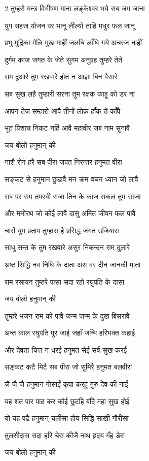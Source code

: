\begin{large}
\begin{multicols}{2}
\twolineshloka
{तुम्हरो मन्त्र विभीषण माना}
{लङ्केश्वर भये सब जग जाना}

\twolineshloka
{युग सहस्र योजन पर भानू}
{लील्यो ताहि मधुर फल जानू}

\twolineshloka
{प्रभु मुद्रिका मेलि मुख माहीं}
{जलधि लाँघि गये अचरज नाहीं}

\twolineshloka
{दुर्गम काज जगत के जेते}
{सुगम अनुग्रह तुम्हरे तेते}

\twolineshloka
{राम दुआरे तुम रखवारे}
{होत न आज्ञा बिन पैसारे}

\twolineshloka
{सब सुख लहै तुम्हारी सरना}
{तुम रक्षक काहू को डर ना}

\twolineshloka
{आपन तेज सम्हारो आपै}
{तीनों लोक हाँक तें काँपै}

\twolineshloka
{भूत पिशाच निकट नहिं आवै}
{महावीर जब नाम सुनावै}

{जय बोलो हनुमान् की}

\twolineshloka
{नाशै रोग हरै सब पीरा}
{जपत निरन्तर हनुमत वीरा}

\twolineshloka
{सङ्कट से हनुमान छुडावै}
{मन क्रम वचन ध्यान जो लावै}

\twolineshloka
{सब पर राम तपस्वी राजा}
{तिन के काज सकल तुम साजा}

\twolineshloka
{और मनोरथ जो कोई लावै}
{दासु अमित जीवन फल पावै}

\twolineshloka
{चारों युग प्रताप तुम्हारा}
{है प्रसिद्ध जगत उजियारा}

\twolineshloka
{साधु सन्त के तुम रखवारे}
{असुर निकन्दन राम दुलारे}

\twolineshloka
{अष्ट सिद्धि नव निधि के दाता}
{अस बर दीन जानकी माता}

\twolineshloka
{राम रसायन तुम्हरे पासा}
{सदा रहो रघुपति के दासा}

{जय बोलो हनुमान् की}

\twolineshloka
{तुम्हरे भजन राम को पावै}
{जन्म जन्म के दुख बिसरावै}

\twolineshloka
{अन्त काल रघुपति पुर जाई}
{जहाँ जन्मि हरिभक्त कहाई}

\twolineshloka
{और देवता चित्त न धरई}
{हनुमत सेई सर्व सुख करई}

\twolineshloka
{सङ्कट कटै मिटै सब पीरा}
{जो सुमिरै हनुमत बलवीरा}

\twolineshloka
{जै जै जै हनुमान गोसाईं}
{कृपा करहु गुरु देव की नाईं}

\twolineshloka
{यह शत पार पाठ कर कोई}
{छूटहि बंदि महा सुख होई}

\twolineshloka
{यो यह पढ़ै हनुमान् चलीसा}
{होय सिद्धि साखी गौरीसा}

\twolineshloka
{तुलसीदास सदा हरि चेरा}
{कीजै नाथ हृदय मँह डेरा}

{जय बोलो हनुमान् की}
\end{multicols}
\end{large}